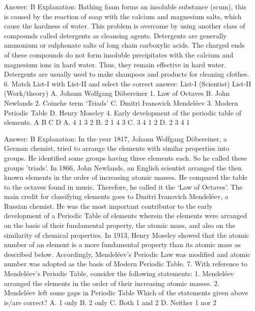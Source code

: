 Answer: B
Explanation: Bathing foam forms an insoluble substance (scum), this is caused by the reaction of soap with the calcium and magnesium salts, which cause the hardness of water. This problem is overcome by using another class of compounds called detergents as cleansing agents. Detergents are generally ammonium or sulphonate salts of long chain carboxylic acids. The charged ends of these compounds do not form insoluble precipitates with the calcium and magnesium ions in hard water. Thus, they remain effective in hard water. Detergents are usually used to make shampoos and products for cleaning clothes. 6. Match List-I with List-II and select the correct 
answer: List-I (Scientist) List-II (Work/theory) A. Johann Wolfgang Döbereiner 1. Law of Octaves B. John Newlands 
2. Coinehe term ‘Triads’ C. Dmitri Ivanovich Mendeléev 3. Modern Periodic Table D. Henry Moseley 4. Early development of the periodic table of elements. A B C D A. 4 1 3 2 B. 2 1 4 3 C. 3 4 1 2 D. 2 3 4 1 

Answer: B
Explanation: In the year 1817, Johann Wolfgang Döbereiner, a German chemist, tried to arrange the elements with similar properties into groups. He identified some groups having three elements each. So he called these groups 'triads'. In 1866, John Newlands, an English scientist arranged the then known elements in the order of increasing atomic masses. He compared the table to the octaves found in music. Therefore, he called it the ‘Law of Octaves’. The main credit for classifying elements goes to Dmitri Ivanovich Mendeléev, a Russian chemist. He was the most important contributor to the early development of a Periodic Table of elements wherein the elements were arranged on the basis of their fundamental property, the atomic mass, and also on the similarity of chemical properties. In 1913, Henry Moseley showed that the atomic number of an element is a more fundamental property than its atomic mass as described below. Accordingly, Mendeléev’s Periodic Law was modified and atomic number was adopted as the basis of Modern Periodic Table. 7. With reference to Mendeléev’s Periodic Table, consider the following statements: 1. Mendeléev arranged the elements in the order of their increasing atomic masses. 2. Mendeléev left some gaps in Periodic Table Which of the statements given above is/are correct? A. 1 only B. 2 only C. Both 1 and 2 D. Neither 1 nor 2 

